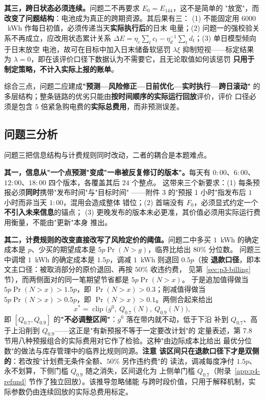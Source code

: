 \documentclass[withoutpreface,bwprint]{cumcmthesis}
\begin{document}
\textbf{其三，跨日状态必须连续。}问题二不再要求 $E_0=E_{144}$，这不是简单的
"放宽"，而\textbf{改变了问题结构}：电池成为真正的跨期资源。其后果有三：
(1) 不能固定用 $6000$~kWh 作每日初值，必须传递当天\textbf{实际执行后}的日末
电量；(2) 问题一的强校验关系不再成立，应改用状态累计关系
$\Delta E=\eta_c\sum_t c_t-\eta_d^{-1}\sum_t d_t$；(3) 单日模型倾向于日末放空
电池，故可在目标中加入日末储备软惩罚 $\lambda\xi$ 抑制短视——标定结果为
$\lambda=0$，即在该评价口径下数据认为不需要它，且无论取值如何该惩罚
\textbf{只用于制定策略，不计入实际上报的账单}。

综合三点，问题二应建成\textbf{"预测—风险修正—日前优化—实时执行—跨日滚动"}
的多层结构；整条链路的优劣只能由\textbf{按时间顺序的实际运行回放}评价，评价
口径必须是包含 $5$ 倍紧急购电费的\textbf{实际总费用}，而非预测误差。

\subsection{问题三分析}

问题三把信息结构与计费规则同时改动，二者的耦合是本题难点。

\textbf{其一，信息从"一个点预测"变成"一串被反复修订的版本"。}每天有
$0{:}00$、$6{:}00$、$12{:}00$、$18{:}00$ 四个版本，各覆盖其后 $24$ 个整点。
这带来三个新要求：(1) 每条预报必须\textbf{同时}携带"发布时间"与"目标时间"
——附件 3 的"预报 1 小时"指发布后 $1$ 小时而非当天 $1{:}00$，混用会造成整体
错位；(2) 首端没有 $F_0$，必须显式约定一个\textbf{不引入未来信息}的锚点；
(3) 更晚发布的版本未必更准，其价值必须用实际运行费用衡量，不能由"更新"本身
推出。

\textbf{其二，计费规则的改变直接改写了风险定价的阈值。}问题二中多买 $1$~kWh
的确定成本是 $p$、少买的期望成本是 $5p\Pr(N>g)$，临界比给出 $80\%$ 分位数。
问题三中调增 $1$~kWh 的确定成本是 $1.5p$，调减 $1$~kWh 则退回 $0.5p$（按
\textbf{退款口径}，即本文主口径：被取消部分的原价退回、再按 $50\%$ 收违约费，
见第~\ref{sec:p3-billing} 节），而两侧面对的同一笔期望节省都是 $5p\Pr(N>x)$。
于是追加值得做当 $5p\Pr(N>x)>1.5p$，即 $\Pr(N>x)>0.3$；削减值得做当
$5p\Pr(N>x)>0.5p$，即 $\Pr(N>x)>0.1$。两侧合起来给出
$$
x^*=\operatorname{clip}\bigl(g^0,\ Q_{0.7}(N),\ Q_{0.9}(N)\bigr),
$$
即 $[Q_{0.7},Q_{0.9}]$ 的\textbf{"不必调整区间"}：$g^0$ 落在带内就不动，低于下沿
补到 $Q_{0.7}$、高于上沿削到 $Q_{0.9}$——这正是"有新预报不等于一定要改计划"的
定量表述，第 7.8 节用八种预报组合的实际费用对它作了检验。这种"由边际成本比给出
最优分位数"的做法与库存管理中的临界比规则同源\cite{ref:newsvendor}。\textbf{注意
该区间只在退款口径下才是双侧的}：若改按"计划费无条件全额、$50\%$ 另作违约费"的
读法，调减每度净付 $1.5p$、永不划算，下侧门槛 $Q_{0.9}$ 随之消失，区间退化为
上侧单门槛 $Q_{0.7}$（附录~\ref{app:p4-refund} 节作了独立回放）。该推导忽略储能
与跨时段价值，只用于解释机制，实际参数仍由连续回放的实际总费用标定。
\end{document}
